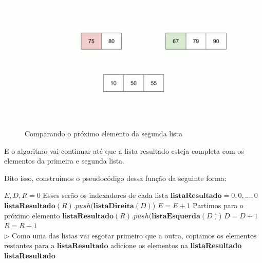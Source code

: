 \begin{figure}[!ht]
	\centering
	\includegraphics[scale=0.3]{figures/merge/merge-function-11.png}
	\caption{Comparando o próximo elemento da segunda lista}
\end{figure}

\FloatBarrier

E o algoritmo vai continuar até que a lista resultado esteja completa com os elementos da primeira e segunda lista.

Dito isso, construímos o pseudocódigo dessa função da seguinte forma:

\begin{algorithm}
	\label{algo:merge_aux_pseudo}
	\begin{algorithmic}[1]
		\Statex
		\State $E, D, R = 0$ \Comment Esses serão os indexadores de cada lista
		\State $\mathbf{listaResultado} = 0, 0,\ldots, 0$
		\State $\mathbf{listaResultado}(R).push(\mathbf{listaDireita}(D)$)
		\State $E = E + 1$ \Comment Partimos para o próximo elemento
		\Else
		\State $\mathbf{listaResultado}(R).push(\mathbf{listaEsquerda}(D)$)
		\State $D = D + 1$
		\EndIf
		\State $R = R + 1$
		\EndWhile
		\State $\rhd \text{ Como uma das listas vai esgotar primeiro que a outra, copiamos os elementos}$
		\State $\text{restantes para a }\mathbf{listaResultado}$
		\State adicione os elementos na \textbf{listaResultado}
		\EndWhile
		\State \Return \textbf{listaResultado}
		\EndFunction
	\end{algorithmic}
\end{algorithm}

